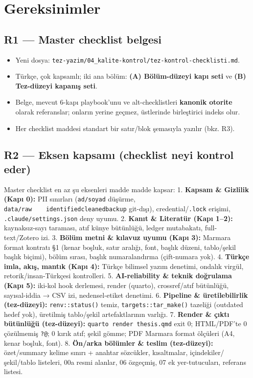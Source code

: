 \documentclass[
  turkish,
  12pt,
  a4paper,
]{report}
\providecommand{\tightlist}{%
  \setlength{\itemsep}{0pt}\setlength{\parskip}{0pt}}
\begin{document}
\section{Gereksinimler}\label{gereksinimler}

\subsection{R1 --- Master checklist
belgesi}\label{r1-master-checklist-belgesi}

\begin{itemize}
\tightlist
\item
  Yeni dosya:
  \texttt{tez-yazim/04\_kalite-kontrol/tez-kontrol-checklisti.md}.
\item
  Türkçe, çok kapsamlı; iki ana bölüm: \textbf{(A) Bölüm-düzeyi kapı
  seti} ve \textbf{(B) Tez-düzeyi kapanış seti}.
\item
  Belge, mevcut 6-kapı playbook'unu ve alt-checklistleri \textbf{kanonik
  otorite} olarak referanslar; onların yerine geçmez, üstlerinde
  birleştirici indeks olur.
\item
  Her checklist maddesi standart bir satır/blok şemasıyla yazılır (bkz.
  R3).
\end{itemize}

\subsection{R2 --- Eksen kapsamı (checklist neyi kontrol
eder)}\label{r2-eksen-kapsamux131-checklist-neyi-kontrol-eder}

Master checklist en az şu eksenleri madde madde kapsar: 1.
\textbf{Kapsam \& Gizlilik (Kapı 0):} PII sınırları (\texttt{ad/soyad}
düşürme,
\texttt{data/raw\textbar{}\ \ \ \ identified\textbar{}cleaned\textbar{}backup}
git-dışı), credential/\texttt{.lock} erişimi,
\texttt{.claude/settings.json} deny uyumu. 2. \textbf{Kanıt \& Literatür
(Kapı 1--2):} kaynaksız-sayı taraması, atıf künye bütünlüğü, ledger
mutabakatı, full-text/Zotero izi. 3. \textbf{Bölüm metni \& kılavuz
uyumu (Kapı 3):} Marmara format kontratı §1 (kenar boşluk, satır
aralığı, font, başlık düzeni, tablo/şekil başlık biçimi), bölüm sırası,
başlık numaralandırma (çift-numara yok). 4. \textbf{Türkçe imla, akış,
mantık (Kapı 4):} Türkçe bilimsel yazım denetimi, ondalık virgül,
retorik/insan-Türkçesi kontrolleri. 5. \textbf{AI-reliability \& teknik
doğrulama (Kapı 5):} iki-kol hook derlemesi, render (quarto),
crossref/atıf bütünlüğü, sayısal-iddia → CSV izi, nedensel-etiket
denetimi. 6. \textbf{Pipeline \& üretilebilirlik (tez-düzeyi):}
\texttt{renv::status()} temiz, \texttt{targets::tar\_make()} tazeliği
(outdated hedef yok), üretilmiş tablo/şekil artefaktlarının varlığı. 7.
\textbf{Render \& çıktı bütünlüğü (tez-düzeyi):}
\texttt{quarto\ render\ thesis.qmd} exit 0; HTML/PDF'te 0 çözülmemiş
\texttt{?@}; 0 kırık atıf; şekil gömme; PDF Marmara format ölçüleri (A4,
kenar boşluk, font). 8. \textbf{Ön/arka bölümler \& teslim
(tez-düzeyi):} özet/summary kelime sınırı + anahtar sözcükler,
kısaltmalar, içindekiler/şekil/tablo listeleri, 00a resmi alanlar, 06
özgeçmiş, 07 ek yer-tutucuları, referans listesi.
\end{document}
